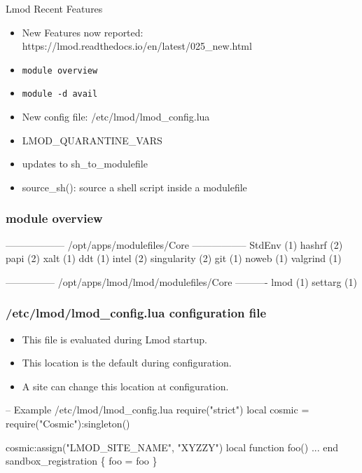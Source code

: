 \documentclass{beamer}
\begin{document}
\begin{frame}{Lmod Recent Features}
  \begin{itemize}
    \item New Features now reported:
      https://lmod.readthedocs.io/en/latest/025\_new.html
    \item \texttt{module overview}
    \item \texttt{module -d avail}
    \item New config file: /etc/lmod/lmod\_config.lua
    \item LMOD\_QUARANTINE\_VARS
    \item updates to sh\_to\_modulefile
    \item source\_sh(): source a shell script inside a modulefile
  \end{itemize}
\end{frame}

\begin{frame}[fragile]
  \frametitle{module overview}
    {\tiny
\begin{semiverbatim}
------------------ /opt/apps/modulefiles/Core -----------------
StdEnv    (1)   hashrf    (2)   papi        (2)   xalt     (1)
ddt       (1)   intel     (2)   singularity (2)
git       (1)   noweb     (1)   valgrind    (1)

--------------- /opt/apps/lmod/lmod/modulefiles/Core ----------
lmod (1)   settarg (1)    
\end{semiverbatim}
    }
\end{frame}

\begin{frame}[fragile]
  \frametitle{/etc/lmod/lmod\_config.lua configuration file}
  \begin{itemize}
    \item This file is evaluated during Lmod startup. 
    \item This location is the default during configuration.
    \item A site can change this location at configuration.
  \end{itemize}
    {\small
\begin{semiverbatim}
-- Example /etc/lmod/lmod\_config.lua
require("strict")
local cosmic = require("Cosmic"):singleton()

cosmic:assign("LMOD\_SITE\_NAME", "XYZZY")
local function foo()
  ...
end
sandbox\_registration \{ foo = foo \}
\end{semiverbatim}
}
\end{frame}
\end{document}
